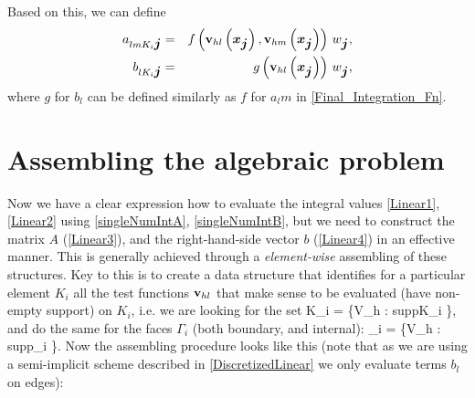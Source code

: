 Based on this, we can define
\begin{eqnarray}
\label{singleNumIntA}
a_{lm K_i \mbox{\boldmath $j$}} & = & f\left(\mathrm{\mathbf{v}}_{hl}\left(\mbox{\boldmath $x$}_{\mbox{\boldmath $j$}}\right), \mathrm{\mathbf{v}}_{hm}\left(\mbox{\boldmath $x$}_{\mbox{\boldmath $j$}}\right)\right)\,w_{\mbox{\boldmath $j$}},\\
\label{singleNumIntB}
b_{l K_i \mbox{\boldmath $j$}} & = & g\left(\mathrm{\mathbf{v}}_{hl}\left(\mbox{\boldmath $x$}_{\mbox{\boldmath $j$}}\right)\right)\,w_{\mbox{\boldmath $j$}},
\end{eqnarray}
where $g$ for $b_l$ can be defined similarly as $f$ for $a_lm$ in \ref{Final_Integration_Fn}.

\section{Assembling the algebraic problem}
Now we have a clear expression how to evaluate the integral values \ref{Linear1}, \ref{Linear2} using \ref{singleNumIntA}, \ref{singleNumIntB}, but we need to construct the matrix $A$ (\ref{Linear3}), and the right-hand-side vector $b$ (\ref{Linear4}) in an effective manner.
This is generally achieved through a \textit{element-wise} assembling of these structures. Key to this is to create a data structure that identifies for a particular element $K_i$ all the test functions $\mathrm{\mathbf{v}}_{hl}$ that make sense to be evaluated (have non-empty support) on $K_i$, i.e. we are looking for the set
\be
\mrvh \lo K_i \ro = \left\{\mrvh \in V_h : supp\lo\mrvh\ro \cap K_i \neq \emptyset \right\},
\ee
and do the same for the faces $\Gamma_i$ (both boundary, and internal):
\be
\mrvh \lo \Gamma_i \ro = \left\{\mrvh \in V_h : supp\lo\mrvh\ro \cap \Gamma_i \neq \emptyset \right\}.
\ee
Now the assembling procedure looks like this (note that as we are using a semi-implicit scheme described in \ref{DiscretizedLinear} we only evaluate terms $b_l$ on edges):\\

